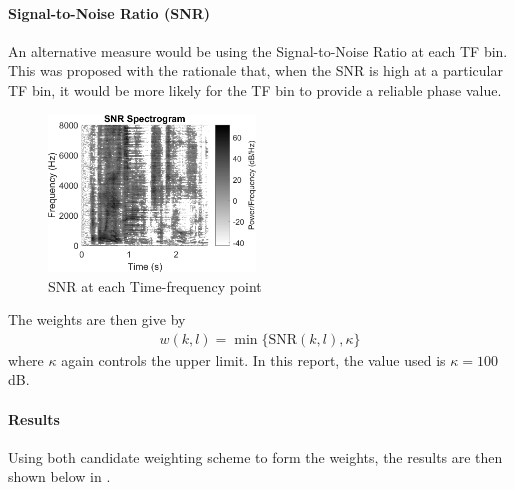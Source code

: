 \documentclass[a4paper,twoside,12pt,hidelinks]{article}
\begin{document}
\paragraph{Signal-to-Noise Ratio (SNR)}
An alternative measure would be using the Signal-to-Noise Ratio at each TF bin. This was proposed with the rationale that, when the SNR is high at a particular TF bin, it would be more likely for the TF bin to provide a reliable phase value.

\begin{figure}[H]
\centering
\includegraphics[width=0.49\textwidth]{snrspect}
\caption{SNR at each Time-frequency point}
\end{figure}
The weights are then give by
\begin{align}
w(k,l)=\min\{\text{SNR}(k,l),\kappa\}
\end{align}
where $\kappa$ again controls the upper limit. In this report, the value used is $\kappa=100$dB.

\paragraph{Results}
Using both candidate weighting scheme to form the weights, the results are then shown below in . 
\end{document}
